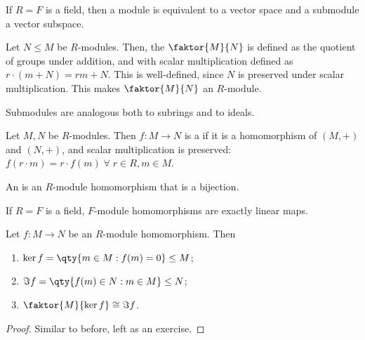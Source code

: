 \begin{example}
	If $R = F$ is a field, then a module is equivalent to a vector space and a submodule a vector subspace.
\end{example} 

\begin{definition}[Quotient]
	Let $N \leq M$ be $R$-modules.
	Then, the  $\faktor{M}{N}$ is defined as the quotient of groups under addition, and with scalar multiplication defined as $r \cdot (m + N) = rm + N$.
	This is well-defined, since $N$ is preserved under scalar multiplication.
	This makes $\faktor{M}{N}$ an $R$-module.
\end{definition}

\begin{remark}
	Submodules are analogous both to subrings and to ideals.
\end{remark}

\begin{definition}[Homomorphism]
	Let $M, N$ be $R$-modules.
	Then $f : M \to N$ is a  if it is a homomorphism of $(M, +)$ and $(N, +)$, and scalar multiplication is preserved: $f(r \cdot m) = r \cdot f(m) \; \forall \; r \in R, m \in M$.
\end{definition}

\begin{definition}[Isomorphism]
	An  is an $R$-module homomorphism that is a bijection.
\end{definition} 

\begin{example}
	If $R = F$ is a field, $F$-module homomorphisms are exactly linear maps.
\end{example}

\begin{theorem}
	Let $f : M \to N$ be an $R$-module homomorphism.
	Then
	\begin{enumerate}
		\item $\ker f = \qty{m \in M : f(m) = 0} \leq M$;
		\item $\Im f = \qty{f(m) \in N : m \in M} \leq N$;
		\item $\faktor{M}{\ker f} \cong \Im f$.
	\end{enumerate}
\end{theorem}

\begin{proof}
	Similar to before, left as an exercise.
\end{proof} 

